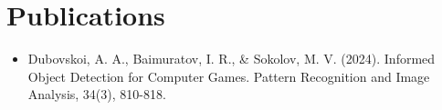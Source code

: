 \documentclass[a4paper,11pt]{article}
\newcommand{\resumeItem}[1]{
  \item\small{#1}
}
\newcommand{\resumeItemListStart}{\begin{itemize}[rightmargin=0.11in]}
\newcommand{\resumeItemListEnd}{\end{itemize}}
\begin{document}


\section{Publications}
\resumeItemListStart{}
    \resumeItem{Dubovskoi, A. A., Baimuratov, I. R., \& Sokolov, M. V. (2024). Informed Object Detection for Computer Games. Pattern Recognition and Image Analysis, 34(3), 810-818.}
\resumeItemListEnd{}




\end{document}
